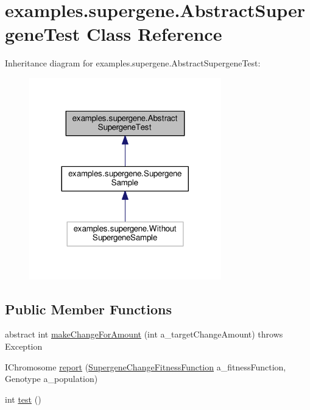 \hypertarget{classexamples_1_1supergene_1_1_abstract_supergene_test}{\section{examples.\-supergene.\-Abstract\-Supergene\-Test Class Reference}
\label{classexamples_1_1supergene_1_1_abstract_supergene_test}
}


Inheritance diagram for examples.\-supergene.\-Abstract\-Supergene\-Test\-:
\nopagebreak
\begin{figure}[H]
\begin{center}
\leavevmode
\includegraphics[width=236pt]{classexamples_1_1supergene_1_1_abstract_supergene_test__inherit__graph}
\end{center}
\end{figure}
\subsection*{Public Member Functions}
\begin{DoxyCompactItemize}
\item 
abstract int \hyperlink{classexamples_1_1supergene_1_1_abstract_supergene_test_af2fc5c540e716975e1c4106e8f95a1a5}{make\-Change\-For\-Amount} (int a\-\_\-target\-Change\-Amount)  throws Exception
\item 
I\-Chromosome \hyperlink{classexamples_1_1supergene_1_1_abstract_supergene_test_a739a675575c3932e123f47b774b358f8}{report} (\hyperlink{classexamples_1_1supergene_1_1_supergene_change_fitness_function}{Supergene\-Change\-Fitness\-Function} a\-\_\-fitness\-Function, Genotype a\-\_\-population)
\item 
int \hyperlink{classexamples_1_1supergene_1_1_abstract_supergene_test_a92f6bbeeedeed872a2cb7cb38e6a40c2}{test} ()
\end{DoxyCompactItemize}
